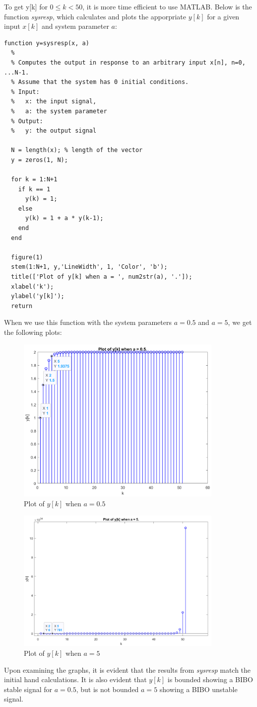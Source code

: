 \documentclass[a4paper, 10pt]{article}
\begin{document}
\noindent To get y[k] for $0 \leq k < 50$, it is more time efficient to use MATLAB.
Below is the function \textit{sysresp}, which calculates and plots the apporpriate
$y[k]$ for a given input $x[k]$ and system parameter $a$:
\begin{lstlisting}[style=Matlab-editor, basicstyle=\small\ttfamily]
  function y=sysresp(x, a)
  %
  % Computes the output in response to an arbitrary input x[n], n=0, ...N-1.
  % Assume that the system has 0 initial conditions.
  % Input:
  %   x: the input signal,
  %   a: the system parameter
  % Output:
  %   y: the output signal

  N = length(x); % length of the vector
  y = zeros(1, N);

  for k = 1:N+1
    if k == 1
      y(k) = 1;
    else
      y(k) = 1 + a * y(k-1);
    end
  end

  figure(1)
  stem(1:N+1, y,'LineWidth', 1, 'Color', 'b');
  title(['Plot of y[k] when a = ', num2str(a), '.']);
  xlabel('k');
  ylabel('y[k]');
  return
\end{lstlisting}
When we use this function with the system parameters $a=0.5$ and $a=5$,
we get the following plots:
\begin{figure}[H]
  \centering
  \includegraphics[width=10cm]{images/yk_graph_1.png}
  \caption{Plot of $y[k]$ when $a=0.5$}
\end{figure}
\begin{figure}[H]
  \centering
  \includegraphics[width=10cm]{images/yk_graph_2.png}
  \caption{Plot of $y[k]$ when $a=5$}
\end{figure}
\noindent Upon examining the graphs, it is evident that the results from \textit{sysresp} match the 
initial hand calculations. It is also evident that $y[k]$ is bounded showing a BIBO stable
signal for $a=0.5$, but is not bounded $a=5$ showing a BIBO unstable signal.
\end{document}
